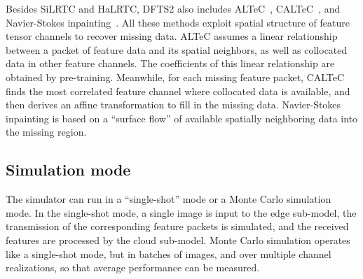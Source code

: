 \documentclass[conference,letterpaper]{IEEEtran}
\begin{document}
Besides SiLRTC and HaLRTC, DFTS2 also includes ALTeC~\cite{Bragile2020}, CALTeC~\cite{CALTeC_ICIP_2021}, and Navier-Stokes inpainting~\cite{navierstokes}. All these methods exploit spatial structure of feature tensor channels to recover missing data. ALTeC assumes a linear relationship between a packet of feature data and its spatial neighbors, as well as collocated data in other feature channels. The coefficients of this linear relationship are obtained by pre-training. Meanwhile, for each missing feature packet, CALTeC finds the most correlated feature channel where collocated data is available, and then derives an affine transformation to fill in the missing data. Navier-Stokes inpainting is based on a ``surface flow'' of available spatially neighboring data into the missing region.

\subsection{Simulation mode}
The simulator can run in a ``single-shot'' mode or a Monte Carlo simulation mode. In the single-shot mode, a single image is input to the edge sub-model, the transmission of the corresponding feature packets is simulated, and the received features are processed by the cloud sub-model. Monte Carlo simulation operates like a single-shot mode, but in batches of images, and over multiple channel realizations, so that average performance can be measured.  
\end{document}
